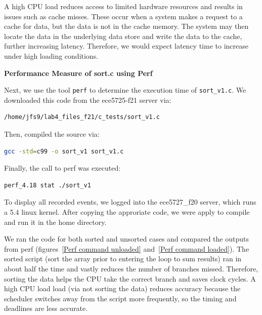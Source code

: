 \documentclass[a4paper,10pt]{article}
\newcommand{\code}[1]{\colorbox{light-gray}{\texttt{#1}}}
\begin{document}
A high CPU load reduces access to limited hardware resources and results in issues such as cache misses. These occur when a system makes a request to a cache for data, but the data is not in the cache memory. The system may then locate the data in the underlying data store and write the data to the cache, further increasing latency. Therefore, we would expect latency time to increase under high loading conditions.





\textbf{Performance Measure of sort.c using Perf}


Next, we use the tool \code{perf} to determine the execution time of \code{sort\_v1.c}. We downloaded this code from the ece5725-f21 server via:
\begin{center}
\begin{lstlisting}[language=bash, label=code:code3] 
/home/jfs9/lab4_files_f21/c_tests/sort_v1.c
\end{lstlisting}
\end{center}\vspace{-1em}

Then, compiled the source via:
\begin{center}
\begin{lstlisting}[language=bash, label=code:code4] 
gcc -std=c99 -o sort_v1 sort_v1.c
\end{lstlisting}
\end{center}\vspace{-1em}

Finally, the call to perf was executed:
\begin{center}
\begin{lstlisting}[language=bash, label=code:code5] 
perf_4.18 stat ./sort_v1
\end{lstlisting}
\end{center}\vspace{-1em}

To display all recorded events, we logged into the ece5727\_f20 server, which runs a 5.4 linux kernel. After copying the approriate code, we were apply to compile and run it in the home directory. 

We ran the code for both sorted and unsorted cases and compared the outputs from perf (figures~\ref{Perf command unloaded} and~\ref{Perf command loaded}). The sorted script (sort the array prior to entering the loop to sum results) ran in about half the time and vastly reduces the number of branches missed. Therefore, sorting the data helps the CPU take the correct branch and saves clock cycles. A high CPU load load (via not sorting the data) reduces accuracy because the scheduler switches away from the script more frequently, so the timing and deadlines are less accurate. 
\end{document}
